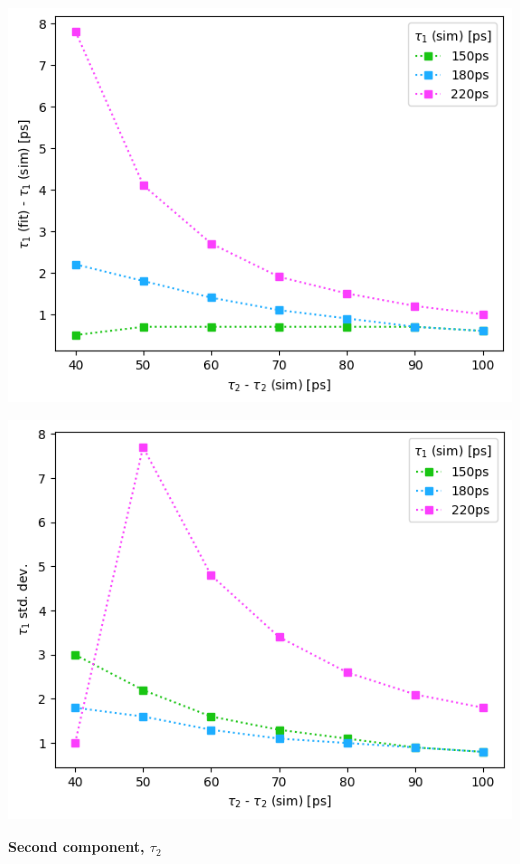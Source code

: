 {\begin{minipage}{.47\linewidth}
    \includegraphics[width=\linewidth]{Batch 3/regular IRF/t1-diff 8020.png}
    \label{fig:comp-t1-8020}
\end{minipage}
\hfill
\begin{minipage}{.47\linewidth}
    \includegraphics[width=\linewidth]{Batch 3/regular IRF/t1-err 8020.png}
    \label{fig:comp-t1err-8020}
\end{minipage}


\textbf{Second component, $\tau_2$}

}
